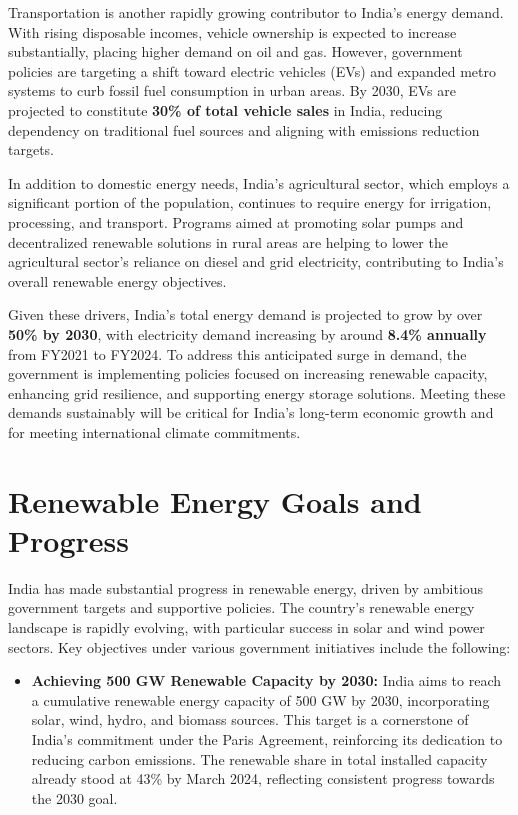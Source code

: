 \documentclass[12pt]{article}
\begin{document}
\begin{spacing}{1.5}
Transportation is another rapidly growing contributor to India’s energy demand. With rising disposable incomes, vehicle ownership is expected to increase substantially, placing higher demand on oil and gas. However, government policies are targeting a shift toward electric vehicles (EVs) and expanded metro systems to curb fossil fuel consumption in urban areas. By 2030, EVs are projected to constitute \textbf{30\% of total vehicle sales} in India, reducing dependency on traditional fuel sources and aligning with emissions reduction targets.

In addition to domestic energy needs, India's agricultural sector, which employs a significant portion of the population, continues to require energy for irrigation, processing, and transport. Programs aimed at promoting solar pumps and decentralized renewable solutions in rural areas are helping to lower the agricultural sector’s reliance on diesel and grid electricity, contributing to India’s overall renewable energy objectives.

Given these drivers, India’s total energy demand is projected to grow by over \textbf{50\% by 2030}, with electricity demand increasing by around \textbf{8.4\% annually} from FY2021 to FY2024. To address this anticipated surge in demand, the government is implementing policies focused on increasing renewable capacity, enhancing grid resilience, and supporting energy storage solutions. Meeting these demands sustainably will be critical for India’s long-term economic growth and for meeting international climate commitments.


\section*{Renewable Energy Goals and Progress}
India has made substantial progress in renewable energy, driven by ambitious government targets and supportive policies. The country's renewable energy landscape is rapidly evolving, with particular success in solar and wind power sectors. Key objectives under various government initiatives include the following:

\begin{itemize}
    \item \textbf{Achieving 500 GW Renewable Capacity by 2030:} India aims to reach a cumulative renewable energy capacity of 500 GW by 2030, incorporating solar, wind, hydro, and biomass sources. This target is a cornerstone of India's commitment under the Paris Agreement, reinforcing its dedication to reducing carbon emissions. The renewable share in total installed capacity already stood at 43\% by March 2024, reflecting consistent progress towards the 2030 goal.
    

\end{itemize}
\end{spacing}
\end{document}
